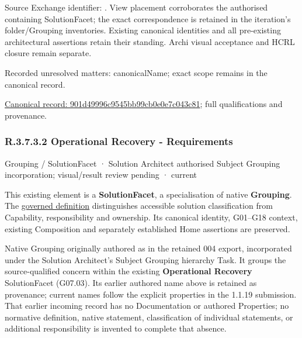 Source Exchange identifier: \texttt{}. View placement corroborates
the authorised containing SolutionFacet; the exact correspondence is retained in the
iteration's folder/Grouping inventories. Existing canonical identities and all
pre-existing architectural assertions retain their standing. Archi visual
acceptance and HCRL closure remain separate.


{\small Recorded unresolved matters: canonicalName; exact scope remains in the canonical record.}\par
{\footnotesize \href{../../../../../../../continuum/grouping/901d49996c9545bb99cb0e0e7c043c81.md}{Canonical record: 901d49996c9545bb99cb0e0e7c043c81}; full qualifications and provenance.}\par
\subsubsection*{R.3.7.3.2 Operational Recovery - Requirements}
\label{navigation:R.3.7.3.2}

\label{element:1a235d13959e477ea52e0f201215fbe9}
{\small Grouping / SolutionFacet · Solution Architect authorised Subject Grouping incorporation; visual/result review pending · current}\par

This existing element is a \textbf{SolutionFacet}, a specialisation of native
\textbf{Grouping}. The \href{\detokenize{../../../../../../../governance/continuum-representation.md#solutionfacet-classification--1119-candidate}}{governed definition}
distinguishes accessible solution classification from Capability, responsibility
and ownership. Its canonical identity, G01–G18 context, existing Composition
and separately established Home assertions are preserved.



Native Grouping originally authored as \texttt{} in the retained 004 export,
incorporated under the Solution Architect's Subject Grouping hierarchy Task.
It groups the source-qualified \texttt{} concern within
the existing \textbf{Operational Recovery} SolutionFacet (G07.03). Its earlier authored name above is retained as provenance; current names
follow the explicit properties in the 1.1.19 submission.
That earlier incoming record has no Documentation or authored Properties; no normative
definition, native statement, classification of individual statements, or
additional responsibility is invented to complete that absence.



